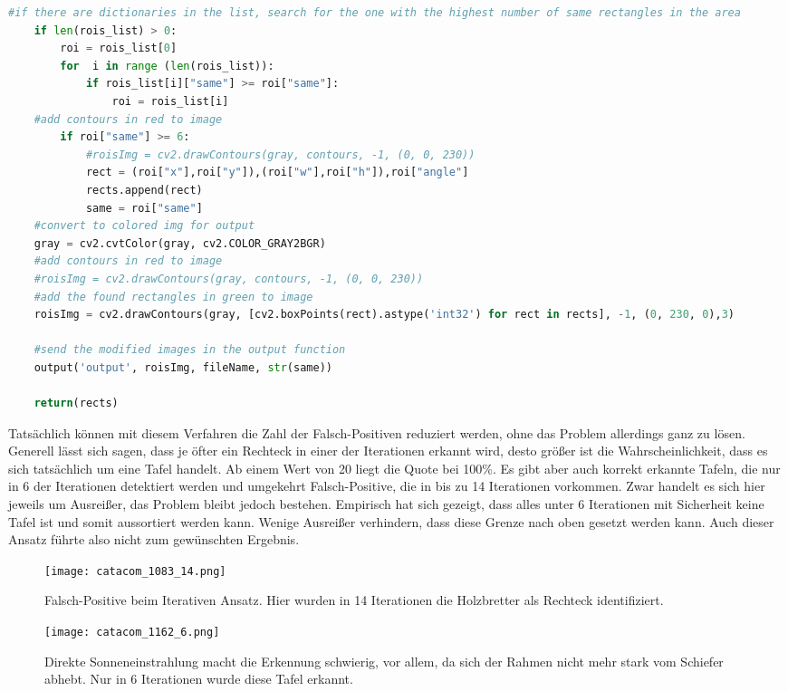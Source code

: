 \begin{lstlisting}[language=Python]
    #if there are dictionaries in the list, search for the one with the highest number of same rectangles in the area
    if len(rois_list) > 0:
        roi = rois_list[0]
        for  i in range (len(rois_list)):
            if rois_list[i]["same"] >= roi["same"]:
                roi = rois_list[i]
    #add contours in red to image
        if roi["same"] >= 6:              
            #roisImg = cv2.drawContours(gray, contours, -1, (0, 0, 230))
            rect = (roi["x"],roi["y"]),(roi["w"],roi["h"]),roi["angle"]
            rects.append(rect)
            same = roi["same"]
    #convert to colored img for output
    gray = cv2.cvtColor(gray, cv2.COLOR_GRAY2BGR)
    #add contours in red to image
    #roisImg = cv2.drawContours(gray, contours, -1, (0, 0, 230))
    #add the found rectangles in green to image
    roisImg = cv2.drawContours(gray, [cv2.boxPoints(rect).astype('int32') for rect in rects], -1, (0, 230, 0),3)
                    
    #send the modified images in the output function
    output('output', roisImg, fileName, str(same))
        
    return(rects)
\end{lstlisting}

Tatsächlich können mit diesem Verfahren die Zahl der Falsch-Positiven reduziert werden, ohne das Problem allerdings ganz zu lösen. Generell lässt sich sagen, dass je öfter ein Rechteck in einer der Iterationen erkannt wird, desto größer ist die Wahrscheinlichkeit, dass es sich tatsächlich um eine Tafel handelt. Ab einem Wert von 20 liegt die Quote bei 100\%. Es gibt aber auch korrekt erkannte Tafeln, die nur in 6 der Iterationen detektiert werden und umgekehrt Falsch-Positive, die in bis zu 14 Iterationen vorkommen. Zwar handelt es sich hier jeweils um Ausreißer, das Problem bleibt jedoch bestehen. Empirisch hat sich gezeigt, dass alles unter 6 Iterationen mit Sicherheit keine Tafel ist und somit aussortiert werden kann. Wenige Ausreißer verhindern, dass diese Grenze nach oben gesetzt werden kann. Auch dieser Ansatz führte also nicht zum gewünschten Ergebnis.
\begin{SCfigure}[0.5][h!]
\caption{Falsch-Positive beim Iterativen Ansatz. Hier wurden in 14 Iterationen die Holzbretter als Rechteck identifiziert.}
\texttt{[image: catacom\_1083\_14.png]}
\end{SCfigure} \begin{SCfigure}[0.5][h!]
\caption{Direkte Sonneneinstrahlung macht die Erkennung schwierig, vor allem, da sich der Rahmen nicht mehr stark vom Schiefer abhebt. Nur in 6 Iterationen wurde diese Tafel erkannt.}
\texttt{[image: catacom\_1162\_6.png]}
\end{SCfigure}\\


